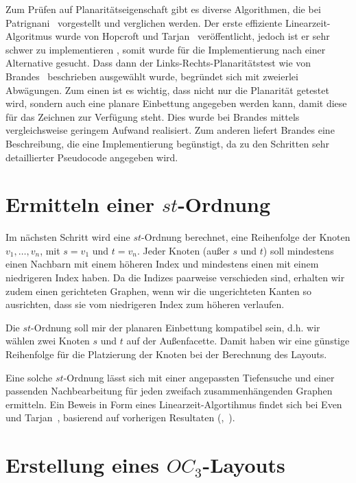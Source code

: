 \documentclass[a4paper]{scrreprt}
\theoremstyle{definition}
\begin{document}
Zum Prüfen auf Planaritätseigenschaft gibt es diverse Algorithmen, die bei Patrignani~\cite{patrignani-07} vorgestellt und verglichen werden. Der erste effiziente Linearzeit-Algoritmus wurde von Hopcroft und Tarjan~\cite{hopcroft+tarjan-74} veröffentlicht, jedoch ist er sehr schwer zu implementieren , somit wurde für die Implementierung nach einer Alternative gesucht. Dass dann der Links-Rechts-Planaritätstest wie von Brandes~\cite{brandes-09} beschrieben ausgewählt wurde, begründet sich mit zweierlei Abwägungen. Zum einen ist es wichtig, dass nicht nur die Planarität getestet wird, sondern auch eine planare Einbettung angegeben werden kann, damit diese für das Zeichnen zur Verfügung steht. Dies wurde bei Brandes mittels vergleichsweise geringem Aufwand realisiert. Zum anderen liefert Brandes eine Beschreibung, die eine Implementierung begünstigt, da zu den Schritten sehr detaillierter Pseudocode angegeben wird.



\section{Ermitteln einer $st$-Ordnung}

Im nächsten Schritt wird eine $st$-Ordnung berechnet, eine Reihenfolge der Knoten $v_1, \dots, v_n$, mit $s=v_1$ und $t=v_n$. Jeder Knoten (außer $s$ und $t$) soll mindestens einen Nachbarn mit einem höheren Index und mindestens einen mit einem niedrigeren Index haben. Da die Indizes paarweise verschieden sind, erhalten wir zudem einen gerichteten Graphen, wenn wir die ungerichteten Kanten so ausrichten, dass sie vom niedrigeren Index zum höheren verlaufen. %

Die $st$-Ordnung soll mir der planaren Einbettung kompatibel sein, d.h. wir wählen zwei Knoten $s$ und $t$ auf der Außenfacette. Damit haben wir eine günstige Reihenfolge für die Platzierung der Knoten bei der Berechnung des Layouts. 

Eine solche $st$-Ordnung lässt sich mit einer angepassten Tiefensuche und einer passenden Nachbearbeitung für jeden zweifach zusammenhängenden Graphen ermitteln. Ein Beweis in Form eines Linearzeit-Algortihmus findet sich bei Even und Tarjan~\cite{even+tarjan-75}, basierend auf vorherigen Resultaten (\cite{hopcroft+tarjan-74},~\cite{tarjan-72}).

\section{Erstellung eines $OC_3$-Layouts}
\end{document}
